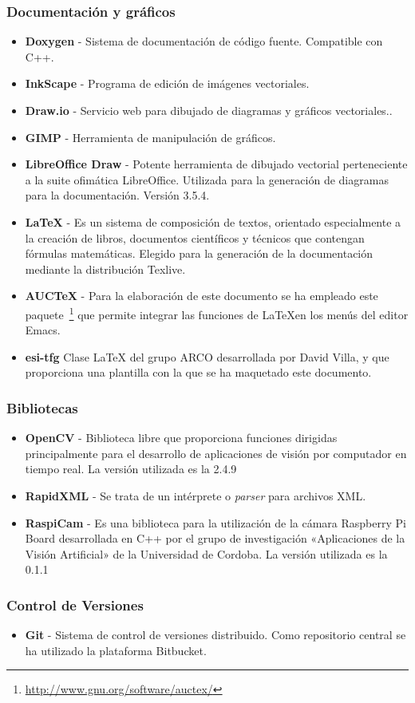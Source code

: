 \subsubsection{Documentación y gráficos}
\begin{itemize}
\item \textbf{Doxygen} - Sistema de documentación de código fuente. Compatible con C++.
\item \textbf{InkScape} - Programa de edición de imágenes vectoriales.
\item \textbf{Draw.io} - Servicio web para dibujado de diagramas y gráficos vectoriales..
\item \textbf{GIMP} - Herramienta de manipulación de gráficos.
\item \textbf{LibreOffice Draw} - Potente herramienta de dibujado vectorial perteneciente a la suite ofimática LibreOffice. Utilizada para la generación de diagramas para la documentación. Versión 3.5.4.
\item \textbf{\LaTeX{}} - Es un sistema de composición de textos, orientado especialmente a la creación de libros, documentos científicos y técnicos que contengan fórmulas matemáticas. Elegido para la generación de la documentación mediante la distribución Texlive. 
\item \textbf{AUCTeX} -  Para la elaboración de este documento se ha empleado este paquete~\footnote{\url{http://www.gnu.org/software/auctex/}} que permite integrar las funciones
  de \LaTeX en los menús del editor Emacs.
\item  \textbf{esi-tfg} Clase \LaTeX{} del grupo \acs{ARCO} desarrollada por David Villa, y que proporciona una plantilla con la que se ha maquetado este documento.
\end{itemize}


\subsubsection{Bibliotecas}
\begin{itemize}
\item \textbf{OpenCV} - Biblioteca libre que proporciona funciones dirigidas principalmente para el desarrollo de aplicaciones de visión por computador en tiempo real. La versión utilizada es la 2.4.9
\item \textbf{RapidXML} - Se trata de un intérprete o \textit{parser} para archivos XML.
\item \textbf{RaspiCam} - Es una biblioteca para la utilización de la cámara Raspberry Pi Board desarrollada en C++ por el grupo de investigación «Aplicaciones de la Visión Artificial» de la Universidad de Cordoba. La versión utilizada es la 0.1.1 
\end{itemize}

\subsubsection{Control de Versiones}
\begin{itemize}
\item \textbf{Git} - Sistema de control de versiones distribuido. Como repositorio central se ha utilizado la plataforma Bitbucket.
\end{itemize}
